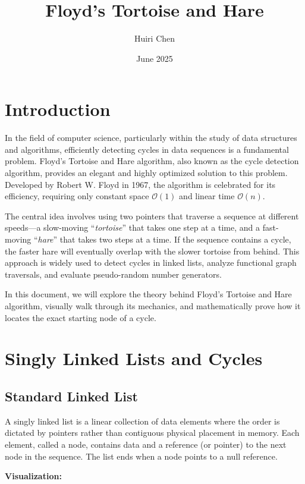 \documentclass[12pt, letterpaper]{article}
\date{June 2025}
\newcommand{\tortoise}{\textit{tortoise}}
\newcommand{\hare}{\textit{hare}}
\begin{document}
\title{Floyd's Tortoise and Hare}
\author{Huiri Chen}
\maketitle

\section{Introduction}  
In the field of computer science, particularly within the study of data structures and algorithms, efficiently detecting cycles in data sequences is a fundamental problem. Floyd's Tortoise and Hare algorithm, also known as the cycle detection algorithm, provides an elegant and highly optimized solution to this problem. Developed by Robert W. Floyd in 1967, the algorithm is celebrated for its efficiency, requiring only constant space $\mathcal{O}(1)$ and linear time $\mathcal{O}(n)$.

The central idea involves using two pointers that traverse a sequence at different speeds—a slow-moving ``\tortoise'' that takes one step at a time, and a fast-moving ``\hare'' that takes two steps at a time. If the sequence contains a cycle, the faster hare will eventually overlap with the slower tortoise from behind. This approach is widely used to detect cycles in linked lists, analyze functional graph traversals, and evaluate pseudo-random number generators.

In this document, we will explore the theory behind Floyd's Tortoise and Hare algorithm, visually walk through its mechanics, and mathematically prove how it locates the exact starting node of a cycle.

\section{Singly Linked Lists and Cycles}

\subsection{Standard Linked List}
A singly linked list is a linear collection of data elements where the order is dictated by pointers rather than contiguous physical placement in memory. Each element, called a node, contains data and a reference (or pointer) to the next node in the sequence. The list ends when a node points to a null reference.

\textbf{Visualization:}
\begin{center}
\end{center}
\end{document}
